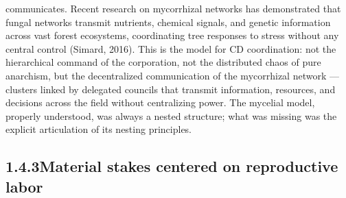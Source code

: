 communicates. Recent research on mycorrhizal networks has demonstrated that fungal networks transmit nutrients, chemical signals, and genetic information across vast forest ecosystems, coordinating tree responses to stress without any central control (Simard, 2016). This is the model for CD coordination: not the hierarchical command of the corporation, not the distributed chaos of pure anarchism, but the decentralized communication of the mycorrhizal network — clusters linked by delegated councils that transmit information, resources, and decisions across the field without centralizing power. The mycelial model, properly understood, was always a nested structure; what was missing was the explicit articulation of its nesting principles.

\subsection{1.4.3\quad Material stakes centered on reproductive labor}


